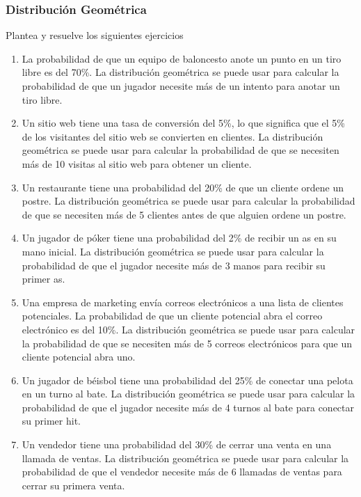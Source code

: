 \subsubsection{Distribución Geométrica}

\begin{Ejer}  Plantea y resuelve los siguientes ejercicios

\begin{enumerate}
    \item La probabilidad de que un equipo de baloncesto anote un punto en un tiro libre es del 70\%. La distribución geométrica se puede usar para calcular la probabilidad de que un jugador necesite más de un intento para anotar un tiro libre.
    \item Un sitio web tiene una tasa de conversión del 5\%, lo que significa que el 5\% de los visitantes del sitio web se convierten en clientes. La distribución geométrica se puede usar para calcular la probabilidad de que se necesiten más de 10 visitas al sitio web para obtener un cliente.
    \item Un restaurante tiene una probabilidad del 20\% de que un cliente ordene un postre. La distribución geométrica se puede usar para calcular la probabilidad de que se necesiten más de 5 clientes antes de que alguien ordene un postre.
    \item Un jugador de póker tiene una probabilidad del 2\% de recibir un as en su mano inicial. La distribución geométrica se puede usar para calcular la probabilidad de que el jugador necesite más de 3 manos para recibir su primer as.
    \item Una empresa de marketing envía correos electrónicos a una lista de clientes potenciales. La probabilidad de que un cliente potencial abra el correo electrónico es del 10\%. La distribución geométrica se puede usar para calcular la probabilidad de que se necesiten más de 5 correos electrónicos para que un cliente potencial abra uno.
    \item Un jugador de béisbol tiene una probabilidad del 25\% de conectar una pelota en un turno al bate. La distribución geométrica se puede usar para calcular la probabilidad de que el jugador necesite más de 4 turnos al bate para conectar su primer hit.
    \item Un vendedor tiene una probabilidad del 30\% de cerrar una venta en una llamada de ventas. La distribución geométrica se puede usar para calcular la probabilidad de que el vendedor necesite más de 6 llamadas de ventas para cerrar su primera venta.

\end{enumerate}
\end{Ejer}
